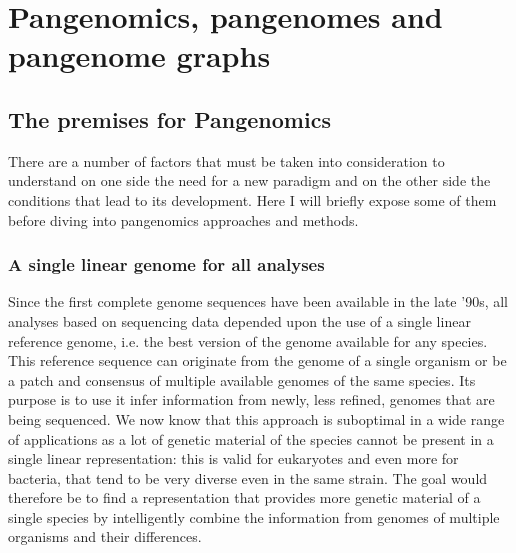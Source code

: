 \section{Pangenomics, pangenomes and pangenome graphs}

\subsection{The premises for Pangenomics}
There are a number of factors that must be taken into consideration to understand on one side the need for a new paradigm and on the other side the conditions that lead to its development. Here I will briefly expose some of them before diving into pangenomics approaches and methods. 

\subsubsection{A single linear genome for all analyses}
Since the first complete genome sequences have been available in the late '90s, all analyses based on sequencing data depended upon the use of a single linear reference genome, i.e. the best version of the genome available for any species. This reference sequence can originate from the genome of a single organism or be a patch and consensus of multiple available genomes of the same species. Its purpose is to use it infer information from newly, less refined, genomes that are being sequenced. We now know that this approach is suboptimal in a wide range of applications as a lot of genetic material of the species cannot be present in a single linear representation: this is valid for eukaryotes and even more for bacteria, that tend to be very diverse even in the same strain. The goal would therefore be to find a representation that provides more genetic material of a single species by intelligently combine the information from genomes of multiple organisms and their differences.

